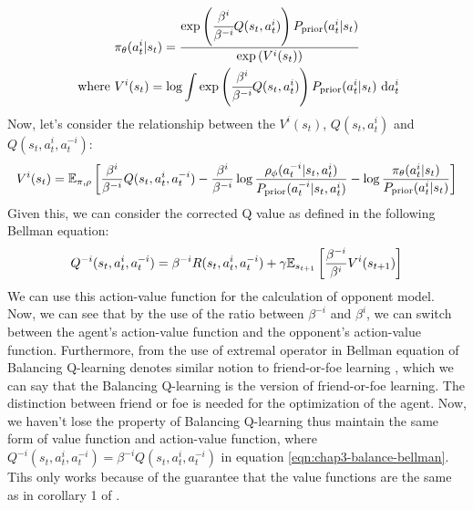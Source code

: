 \begin{equation}
\begin{aligned}
\label{eqn:chap3-prob-agent}
    &\pi_\theta(a^{i}_t | s_t) = \frac{\exp \left(  \cfrac{\beta^{i}}{\beta^{-i}} Q(s_t, a^{i}_t) \right) P_{\text{prior}}(a^{i}_t | s_t)}{\exp\left( V^{i}(s_t) \right)} \\
    \text{ where }& V^{i}(s_t) = \log \int \exp \left(  \cfrac{\beta^{i}}{\beta^{-i}} Q(s_t, a^{i}_t) \right) P_{\text{prior}}(a^{i}_t | s_t) \ \mathrm{d} a^{i}_t
\end{aligned}
\end{equation}
Now, let's consider the relationship between the $V^{i}(s_t)$, $Q(s_t, a_t^{i})$ and $Q(s_t, a^i_t, a^{-i}_t)$:
\begin{equation}
\label{eqn:chap3-prob-balance-val}
    V^{i}(s_t) = \mathbb{E}_{\pi, \rho}\left[ \frac{\beta^{i}}{\beta^{-i}} Q(s_t, a^i_t, a^{-i}_t) - \frac{\beta^{i}}{\beta^{-i}}\log\frac{\rho_\phi(a^{-i}_t | s_t, a^i_t)}{P_{\text{prior}}( a^{-i}_t| s_t, a^i_t)} - \log \frac{\pi_\theta(a^{i}_t | s_t)}{P_{\text{prior}}(a^{i}_t | s_t)} \right]
\end{equation}
Given this, we can consider the corrected Q value as defined in the following Bellman equation:
\begin{equation}
    Q^{-i}(s_t, a^i_t, a^{-i}_t) = \beta^{-i} R(s_t, a^i_t, a^{-i}_t) + \gamma \mathbb{E}_{s_{t+1}}\left[ \frac{\beta^{-i}}{\beta^i}V^{i}(s_{t+1}) \right]    
\end{equation}
We can use this action-value function for the calculation of opponent model. Now, we can see that by the use of the ratio between $\beta^{-i}$ and $\beta^{i}$, we can switch between the agent's action-value function and the opponent's action-value function. Furthermore, from the use of extremal operator in Bellman equation \cite{grau2018balancing} of Balancing Q-learning denotes similar notion to friend-or-foe learning \cite{littman2001friend}, which we can say that the Balancing Q-learning is the  version of friend-or-foe learning. The distinction between friend or foe is needed for the optimization of the agent. Now, we haven't lose the property of Balancing Q-learning thus maintain the same form of value function and action-value function, where $Q^{-i}(s_t, a^i_t, a^{-i}_t) = \beta^{-i} Q(s_t, a^i_t, a^{-i}_t)$ in equation \ref{eqn:chap3-balance-bellman}. Tihs only works because of the guarantee that the value functions are the same as in corollary 1 of \cite{grau2018balancing}. 

